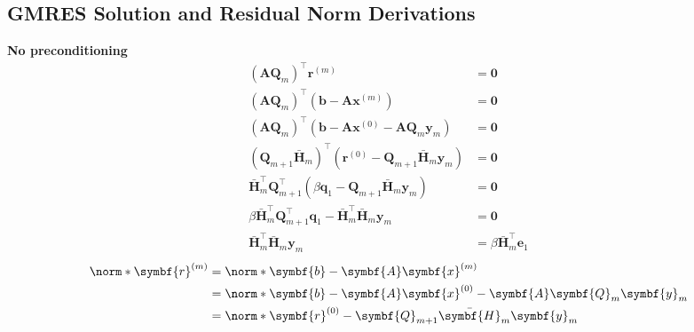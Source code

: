 \documentclass{article}
\begin{document}
\begin{multicols}{2}
    \section{GMRES Solution and Residual Norm Derivations}
    \textbf{No preconditioning}
    \begin{align*}
        \left( \symbf{A} \symbf{Q}_m \right)^\top \symbf{r}^{\left( m \right)}                                                                            & = \symbf{0}                                \\
        \left( \symbf{A} \symbf{Q}_m \right)^\top \left( \symbf{b} - \symbf{A} \symbf{x}^{\left( m \right)} \right)                                       & = \symbf{0}                                \\
        \left( \symbf{A} \symbf{Q}_m \right)^\top \left( \symbf{b} - \symbf{A} \symbf{x}^{\left( 0 \right)} - \symbf{A} \symbf{Q}_m \symbf{y}_m \right)   & = \symbf{0}                                \\
        \left( \symbf{Q}_{m+1} \bar{\symbf{H}}_m \right)^\top \left( \symbf{r}^{\left( 0 \right)} - \symbf{Q}_{m+1} \bar{\symbf{H}}_m \symbf{y}_m \right) & = \symbf{0}                                \\
        \bar{\symbf{H}}_m^\top \symbf{Q}_{m+1}^\top \left( \beta \symbf{q}_1 - \symbf{Q}_{m+1} \bar{\symbf{H}}_m \symbf{y}_m \right)                      & = \symbf{0}                                \\
        \beta \bar{\symbf{H}}_m^\top \symbf{Q}_{m+1}^\top \symbf{q}_1 - \bar{\symbf{H}}_m^\top \bar{\symbf{H}}_m \symbf{y}_m                              & = \symbf{0}                                \\
        \bar{\symbf{H}}_m^\top \bar{\symbf{H}}_m \symbf{y}_m                                                                                              & = \beta \bar{\symbf{H}}_m^\top \symbf{e}_1
    \end{align*}
    \begin{align*}
        \norm*{\symbf{r}^{\left( m \right)}} & = \norm*{\symbf{b} - \symbf{A} \symbf{x}^{\left( m \right)}}                                                                                           \\
                                             & = \norm*{\symbf{b} - \symbf{A} \symbf{x}^{\left( 0 \right)} - \symbf{A} \symbf{Q}_m \symbf{y}_m}                                                       \\
                                             & = \norm*{\symbf{r}^{\left( 0 \right)} - \symbf{Q}_{m+1} \bar{\symbf{H}}_m \symbf{y}_m}                                                                 \\

\end{align*}
\end{multicols}
\end{document}
